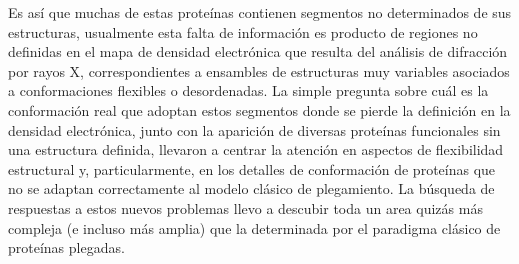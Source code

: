 Es así que muchas de estas proteínas contienen segmentos no determinados de sus estructuras, 
usualmente esta falta de información es producto de regiones no definidas en el mapa de densidad electrónica que resulta del análisis de difracción por rayos X, 
correspondientes a ensambles de estructuras muy variables asociados a conformaciones flexibles o desordenadas. 
La simple pregunta sobre cuál es la conformación real que adoptan estos segmentos donde se pierde la definición en la densidad electrónica, junto con la aparición de diversas proteínas funcionales sin una estructura definida, 
llevaron a centrar la atención en aspectos de flexibilidad estructural y, particularmente, en los detalles de conformación de proteínas que no se adaptan correctamente al modelo clásico de plegamiento.
La búsqueda de respuestas a estos nuevos problemas llevo a descubir toda un area quizás más compleja (e incluso más amplia) que la determinada por el paradigma clásico de proteínas plegadas.








